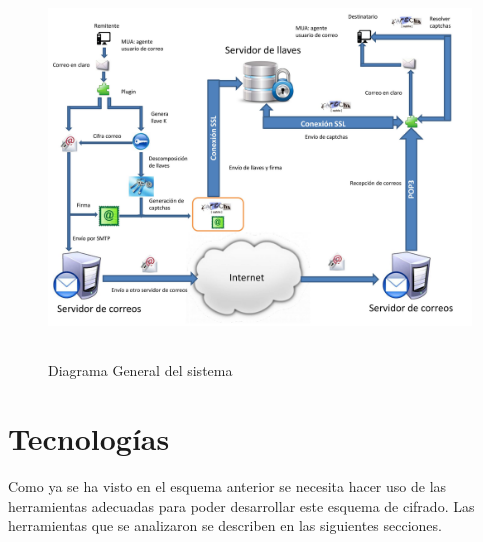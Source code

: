 \documentclass[12pt,oneside,onecolumn,openany]{report}
\begin{document}
\begin{figure}[h]
	\includegraphics[width=1\linewidth, height=10cm]{./images/0001.jpg}
	\caption{Diagrama General del sistema}
	\label{fig:4-1-1}
\end{figure}
\section{Tecnologías}
Como ya se ha visto en el esquema anterior se necesita hacer uso de las herramientas adecuadas para poder desarrollar este esquema de cifrado. Las herramientas que se analizaron se describen en las siguientes secciones.\\
\end{document}
